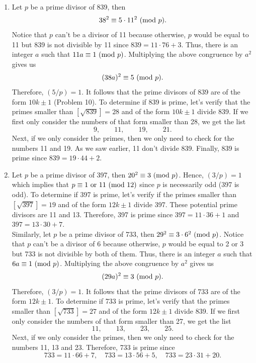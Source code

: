 \begin{solution}
    \begin{enumerate}
        \item Let $p$ be a prime divisor of 839, then
        $$38^2 \equiv 5 \cdot 11^2 \ (\mathrm{mod}\ p).$$
        Notice that $p$ can't be a divisor of 11 because otherwise, $p$ would be equal to 11 but 839 is not divisible by 11 since $839 = 11\cdot 76 + 3$. Thus, there is an integer $a$ such that $11a \equiv 1 \ (\mathrm{mod}\ p)$. Multiplying the above congruence by $a^2$ gives us 
        $$(38a)^2 \equiv 5 \ (\mathrm{mod}\ p).$$
        Therefore, $(5/p) = 1$. It follows that the prime divisors of 839 are of the form $10k \pm 1$ (Problem 10). To determine if 839 is prime, let's verify that the primes smaller than $[\sqrt{839}] = 28$ and of the form $10k \pm 1$ divide 839. If we first only consider the numbers of that form smaller than 28, we get the list
        $$9, \qquad 11, \qquad 19, \qquad 21.$$
        Next, if we only consider the primes, then we only need to check for the numbers 11 and 19. As we saw earlier, 11 don't divide 839. Finally, 839 is prime since $839 = 19 \cdot 44 + 2$.
        \item Let $p$ be a prime divisor of 397, then $20^2 \equiv 3 \ (\mathrm{mod}\ p)$. Hence, $(3/p) = 1$ which implies that $p \equiv 1 \text{ or } 11 \ (\mathrm{mod}\ 12)$ since $p$ is necessarily odd (397 is odd). To determine if 397 is prime, let's verify if the primes smaller than $[\sqrt{397}] = 19$ and of the form $12k \pm 1$ divide 397. These potential prime divisors are 11 and 13. Therefore, 397 is prime since $397 = 11\cdot 36 + 1$ and $397 = 13 \cdot 30 + 7$.\\
        
        Similarly, let $p$ be a prime divisor of 733, then $29^2 \equiv 3 \cdot 6^2 \ (\mathrm{mod}\ p)$. Notice that $p$ can't be a divisor of 6 because otherwise, $p$ would be equal to 2 or 3 but 733 is not divisible by both of them. Thus, there is an integer $a$ such that $6a \equiv 1 \ (\mathrm{mod}\ p)$. Multiplying the above congruence by $a^2$ gives us 
        $$(29a)^2 \equiv 3 \ (\mathrm{mod}\ p).$$
        Therefore, $(3/p) = 1$. It follows that the prime divisors of 733 are of the form $12k \pm 1$. To determine if 733 is prime, let's verify that the primes smaller than $[\sqrt{733}] = 27$ and of the form $12k \pm 1$ divide 839. If we first only consider the numbers of that form smaller than 27, we get the list
        $$11, \qquad 13, \qquad 23, \qquad 25.$$
        Next, if we only consider the primes, then we only need to check for the numbers 11, 13 and 23. Therefore, 733 is prime since
        $$733 = 11\cdot 66 + 7, \quad 733 = 13\cdot 56 + 5, \quad 733 = 23 \cdot 31 + 20.$$ \\
    \end{enumerate}
\end{solution}

